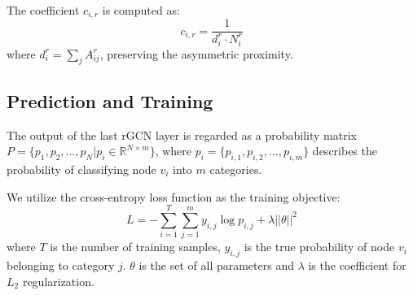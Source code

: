 The coefficient $c_{i,r}$ is computed as:
\begin{equation}
c_{i,r}=\frac{1}{d_i^r\cdot N_i^r}
\end{equation}
where $d_i^r=\sum_{j}A^r_{ij}$, preserving the asymmetric proximity.


\subsection{Prediction and Training}
The output of the last rGCN layer is regarded as a probability matrix $P=\{p_1,p_2,...,p_N|p_i\in \mathbb{R}^{N \times m}\}$, where $p_i=\{p_{i,1},p_{i,2},...,p_{i,m}\}$ describes the probability of classifying node $v_i$ into $m$ categories. 

We utilize the cross-entropy loss function as the training objective:
\begin{equation}
L=-\sum_{i=1}^T\sum_{j=1}^m y_{i,j}\log p_{i,j}+\lambda ||\theta||^2
\end{equation}
where $T$ is the number of training samples, $y_{i,j}$ is the true probability of node $v_i$ belonging to category $j$. $\theta$ is the set of all parameters and $\lambda$ is the coefficient for $L_2$  regularization.
